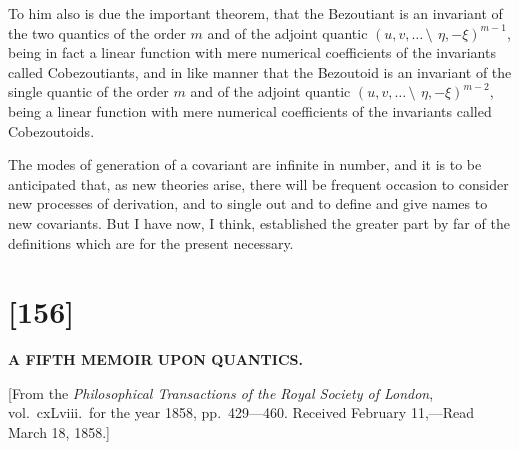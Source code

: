 \documentclass[12pt,a4paper]{article}
\begin{document}
To him also is due the important theorem, that the Bezoutiant is an invariant of the two quantics of the order $m$ and of the adjoint quantic $(u, v, \ldots \,\setminus\!\!\:\, \eta, -\xi)^{m-1}$, being in fact a linear function with mere numerical coefficients of the invariants called Cobezoutiants, and in like manner that the Bezoutoid is an invariant of the single quantic of the order $m$ and of the adjoint quantic $(u, v, \ldots \,\setminus\!\!\:\, \eta, -\xi)^{m-2}$, being a linear function with mere numerical coefficients of the invariants called Cobezoutoids.

The modes of generation of a covariant are infinite in number, and it is to be anticipated that, as new theories arise, there will be frequent occasion to consider new processes of derivation, and to single out and to define and give names to new covariants. But I have now, I think, established the greater part by far of the definitions which are for the present necessary.



\newpage
\section*{[156]}

\begin{center}
\Large\textbf{A FIFTH MEMOIR UPON QUANTICS.}
\end{center}

\begin{center}
\small[From the \textit{Philosophical Transactions of the Royal Society of London}, vol.~cxLviii.\ for the year 1858, pp.~429---460. Received February 11,---Read March 18, 1858.]
\end{center}
\end{document}
